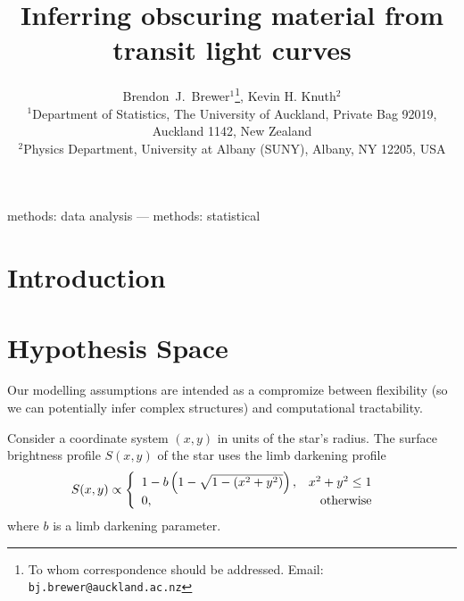 \documentclass[a4paper,fleqn,usenatbib]{mnras}
\title[]
{Inferring obscuring material from transit light curves}
\author[Brewer and Knuth]{%
  Brendon~J.~Brewer$^{1}$\thanks{To whom correspondence should be addressed. Email: {\tt bj.brewer@auckland.ac.nz}},
  Kevin H. Knuth$^2$
  \medskip\\
  $^1$Department of Statistics, The University of Auckland, Private Bag 92019,
        Auckland 1142, New Zealand\\
  $^2$Physics Department, University at Albany (SUNY), Albany, NY 12205, USA}
\date{}
\begin{document}
\label{firstpage}
\pagerange{\pageref{firstpage}--\pageref{lastpage}}
\maketitle

\begin{abstract}
\end{abstract}

\begin{keywords}
methods: data analysis --- methods: statistical
\end{keywords}



\section{Introduction}


\section{Hypothesis Space}
Our modelling assumptions are intended as a compromize between flexibility
(so we can potentially infer complex structures) and computational
tractability.

Consider a coordinate system $(x,y)$ in units of the star's radius.
The surface brightness profile
$S(x, y)$ of the star uses the limb darkening profile
\begin{align}
S(x, y) &\propto
    \left\{
        \begin{array}{lr}
            1 - b\left(1 - \sqrt{1 - (x^2 + y^2)}\right),   & x^2+y^2 \leq 1\\
            0, & \textnormal{otherwise}
        \end{array}
    \right.
\end{align}
where $b$ is a limb darkening parameter.
\end{document}
